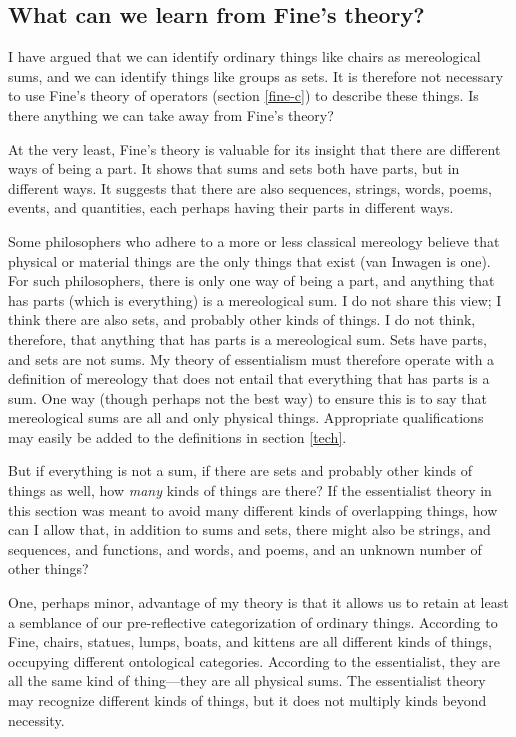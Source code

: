 \documentclass[11pt]{article}
\begin{document}
\begin{spacing}{1.5}
\subsection{What can we learn from Fine's theory?}
\label{need-fine}
I have argued that we can identify ordinary things like chairs as
mereological sums, and we can identify things like groups as sets.  It
is therefore not necessary to use Fine's theory of operators (section
\ref{fine-c}) to describe these things.  Is there anything we can take
away from Fine's theory?

At the very least, Fine's theory is valuable for its insight that
there are different ways of being a part.  It shows that sums and sets
both have parts, but in different ways.  It suggests that there are
also sequences, strings, words, poems, events, and quantities, each
perhaps having their parts in different ways.

Some philosophers who adhere to a more or less classical mereology
believe that physical or material things are the only things that
exist (van Inwagen is one).  For such philosophers, there is only one
way of being a part, and anything that has parts (which is everything)
is a mereological sum.  I do not share this view; I think there are
also sets, and probably other kinds of things.  I do not think,
therefore, that anything that has parts is a mereological sum.  Sets
have parts, and sets are not sums.  My theory of essentialism must
therefore operate with a definition of mereology that does not entail
that everything that has parts is a sum.  One way (though perhaps not
the best way) to ensure this is to say that mereological sums are all
and only physical things.  Appropriate qualifications may easily be
added to the definitions in section \ref{tech}.

But if everything is not a sum, if there are sets and probably other
kinds of things as well, how {\em many} kinds of things are there?  If
the essentialist theory in this section was meant to avoid many
different kinds of overlapping things, how can I allow that, in
addition to sums and sets, there might also be strings, and sequences,
and functions, and words, and poems, and an unknown number of other
things?

One, perhaps minor, advantage of my theory is that it allows us to
retain at least a semblance of our pre-reflective categorization of
ordinary things.  According to Fine, chairs, statues, lumps, boats,
and kittens are all different kinds of things, occupying different
ontological categories.  According to the essentialist, they are all
the same kind of thing---they are all physical sums.  The essentialist
theory may recognize different kinds of things, but it does not
multiply kinds beyond necessity.


\end{spacing}
\end{document}
